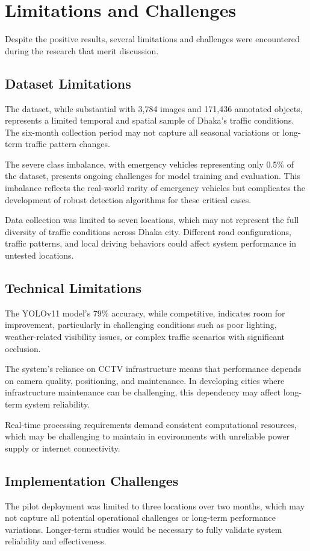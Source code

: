 \section{Limitations and Challenges}
\label{sec:limitations}

Despite the positive results, several limitations and challenges were encountered during the research that merit discussion.

\subsection{Dataset Limitations}
The dataset, while substantial with 3,784 images and 171,436 annotated objects, represents a limited temporal and spatial sample of Dhaka's traffic conditions. The six-month collection period may not capture all seasonal variations or long-term traffic pattern changes.

The severe class imbalance, with emergency vehicles representing only 0.5\% of the dataset, presents ongoing challenges for model training and evaluation. This imbalance reflects the real-world rarity of emergency vehicles but complicates the development of robust detection algorithms for these critical cases.

Data collection was limited to seven locations, which may not represent the full diversity of traffic conditions across Dhaka city. Different road configurations, traffic patterns, and local driving behaviors could affect system performance in untested locations.

\subsection{Technical Limitations}
The YOLOv11 model's 79\% accuracy, while competitive, indicates room for improvement, particularly in challenging conditions such as poor lighting, weather-related visibility issues, or complex traffic scenarios with significant occlusion.

The system's reliance on CCTV infrastructure means that performance depends on camera quality, positioning, and maintenance. In developing cities where infrastructure maintenance can be challenging, this dependency may affect long-term system reliability.

Real-time processing requirements demand consistent computational resources, which may be challenging to maintain in environments with unreliable power supply or internet connectivity.

\subsection{Implementation Challenges}
The pilot deployment was limited to three locations over two months, which may not capture all potential operational challenges or long-term performance variations. Longer-term studies would be necessary to fully validate system reliability and effectiveness.

